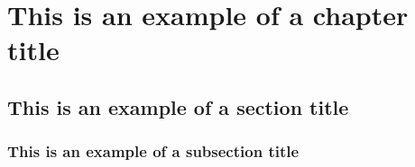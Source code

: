 \documentclass[13pt,a4paper]{extreport}
\begin{document}
\justifying
{}
\chapter{This is an example of a chapter title}

\justifying
\section{This is an example of a section title}

\justifying
\subsection{This is an example of a subsection title}





\begin{appendices}
















\end{appendices}
\end{document}
